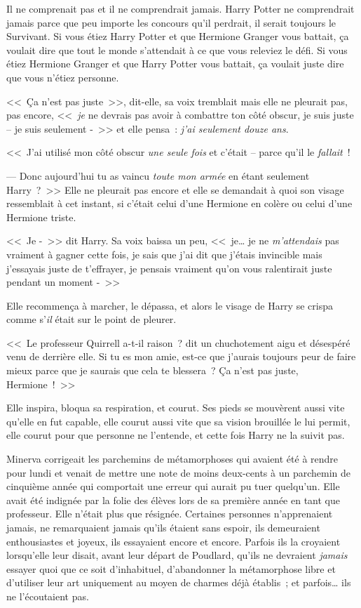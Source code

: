 Il ne comprenait pas et il ne comprendrait jamais. Harry Potter ne comprendrait jamais parce que peu importe les concours qu'il perdrait, il serait toujours le Survivant. Si vous étiez Harry Potter et que Hermione Granger vous battait, ça voulait dire que tout le monde s'attendait à ce que vous releviez le défi. Si vous étiez Hermione Granger et que Harry Potter vous battait, ça voulait juste dire que vous n'étiez personne.

<<~Ça n'est pas juste~>>, dit-elle, sa voix tremblait mais elle ne pleurait pas, pas encore, <<~\emph{je} ne devrais pas avoir à combattre ton côté obscur, je suis juste -- je suis seulement -~>> et elle pensa~: \emph{j'ai seulement douze ans}.

<<~J'ai utilisé mon côté obscur \emph{une seule fois} et c'était -- parce qu'il le \emph{fallait}~!

--- Donc aujourd'hui tu as vaincu \emph{toute mon armée} en étant seulement Harry~?~>> Elle ne pleurait pas encore et elle se demandait à quoi son visage ressemblait à cet instant, si c'était celui d'une Hermione en colère ou celui d'une Hermione triste.

<<~Je -~>> dit Harry. Sa voix baissa un peu, <<~je… je ne \emph{m'attendais} pas vraiment à gagner cette fois, je sais que j'ai dit que j'étais invincible mais j'essayais juste de t'effrayer, je pensais vraiment qu'on vous ralentirait juste pendant un moment -~>>

Elle recommença à marcher, le dépassa, et alors le visage de Harry se crispa comme s'\emph{il} était sur le point de pleurer.

<<~Le professeur Quirrell a-t-il raison~? dit un chuchotement aigu et désespéré venu de derrière elle. Si tu es mon amie, est-ce que j'aurais toujours peur de faire mieux parce que je saurais que cela te blessera~? Ça n'est pas juste, Hermione~!~>>

Elle inspira, bloqua sa respiration, et courut. Ses pieds se mouvèrent aussi vite qu'elle en fut capable, elle courut aussi vite que sa vision brouillée le lui permit, elle courut pour que personne ne l'entende, et cette fois Harry ne la suivit pas.

\later

Minerva corrigeait les parchemins de métamorphoses qui avaient été à rendre pour lundi et venait de mettre une note de moins deux-cents à un parchemin de cinquième année qui comportait une erreur qui aurait pu tuer quelqu'un. Elle avait été indignée par la folie des élèves lors de sa première année en tant que professeur. Elle n'était plus que résignée. Certaines personnes n'apprenaient jamais, ne remarquaient jamais qu'ils étaient sans espoir, ils demeuraient enthousiastes et joyeux, ils essayaient encore et encore. Parfois ils la croyaient lorsqu'elle leur disait, avant leur départ de Poudlard, qu'ils ne devraient \emph{jamais} essayer quoi que ce soit d'inhabituel, d'abandonner la métamorphose libre et d'utiliser leur art uniquement au moyen de charmes déjà établis~; et parfois… ils ne l'écoutaient pas.

